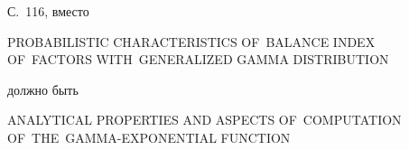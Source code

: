 \noindent


С.~116, вместо 





\bigskip





\noindent


PROBABILISTIC CHARACTERISTICS OF~BALANCE INDEX\\[3pt]


 OF~\mbox{FACTORS} WITH~GENERALIZED GAMMA DISTRIBUTION





\bigskip





\noindent


должно быть





\bigskip





\noindent


ANALYTICAL PROPERTIES AND ASPECTS OF~COMPUTATION\\[3pt] 


OF~THE~GAMMA-EXPONENTIAL FUNCTION





 











  







 \thispagestyle{headings}


 




  





\label{end\stat}





\renewcommand{\bibname}{\protect\rm Литература}  


